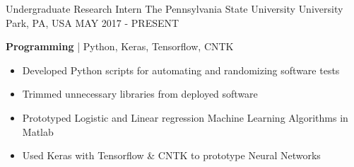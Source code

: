 

\begin{cventries}
	
	\cventry
	{Undergraduate Research Intern} %
	{The Pennsylvania State University} %
	{University Park, PA, USA} %
	{MAY 2017 - PRESENT} %
	{
		\begin{cvitems} %
			\item {\textbf{Programming} | {\color{awesome}Python, Keras, Tensorflow, CNTK}
				\begin{itemize}[noitemsep,wide=0pt, leftmargin=\dimexpr{} + 2\relax]
					\item[\textbullet]{Developed Python scripts for automating and randomizing software tests}
					\item[\textbullet]{Trimmed unnecessary libraries from deployed software}
					\item[\textbullet]{Prototyped Logistic and Linear regression Machine Learning Algorithms in Matlab}
					\item[\textbullet]{Used Keras with Tensorflow \& CNTK to prototype Neural Networks}
				\end{itemize}}
		\end{cvitems}
	}
	

\end{cventries}
